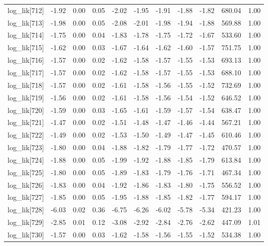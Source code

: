 \begin{table}[ht]
\begin{tabular}{rrrrrrrrrrr}
  log\_lik[712] & -1.92 & 0.00 & 0.05 & -2.02 & -1.95 & -1.91 & -1.88 & -1.82 & 680.04 & 1.00 \\ 
  log\_lik[713] & -1.98 & 0.00 & 0.05 & -2.08 & -2.01 & -1.98 & -1.94 & -1.88 & 569.88 & 1.00 \\ 
  log\_lik[714] & -1.75 & 0.00 & 0.04 & -1.83 & -1.78 & -1.75 & -1.72 & -1.67 & 533.60 & 1.00 \\ 
  log\_lik[715] & -1.62 & 0.00 & 0.03 & -1.67 & -1.64 & -1.62 & -1.60 & -1.57 & 751.75 & 1.00 \\ 
  log\_lik[716] & -1.57 & 0.00 & 0.02 & -1.62 & -1.58 & -1.57 & -1.55 & -1.53 & 693.13 & 1.00 \\ 
  log\_lik[717] & -1.57 & 0.00 & 0.02 & -1.62 & -1.58 & -1.57 & -1.55 & -1.53 & 688.10 & 1.00 \\ 
  log\_lik[718] & -1.57 & 0.00 & 0.02 & -1.61 & -1.58 & -1.56 & -1.55 & -1.52 & 732.69 & 1.00 \\ 
  log\_lik[719] & -1.56 & 0.00 & 0.02 & -1.61 & -1.58 & -1.56 & -1.54 & -1.52 & 646.52 & 1.00 \\ 
  log\_lik[720] & -1.59 & 0.00 & 0.03 & -1.65 & -1.61 & -1.59 & -1.57 & -1.54 & 638.47 & 1.00 \\ 
  log\_lik[721] & -1.47 & 0.00 & 0.02 & -1.51 & -1.48 & -1.47 & -1.46 & -1.44 & 567.21 & 1.00 \\ 
  log\_lik[722] & -1.49 & 0.00 & 0.02 & -1.53 & -1.50 & -1.49 & -1.47 & -1.45 & 610.46 & 1.00 \\ 
  log\_lik[723] & -1.80 & 0.00 & 0.04 & -1.88 & -1.82 & -1.79 & -1.77 & -1.72 & 470.57 & 1.00 \\ 
  log\_lik[724] & -1.88 & 0.00 & 0.05 & -1.99 & -1.92 & -1.88 & -1.85 & -1.79 & 613.84 & 1.00 \\ 
  log\_lik[725] & -1.80 & 0.00 & 0.05 & -1.89 & -1.83 & -1.79 & -1.76 & -1.71 & 467.34 & 1.00 \\ 
  log\_lik[726] & -1.83 & 0.00 & 0.04 & -1.92 & -1.86 & -1.83 & -1.80 & -1.75 & 556.52 & 1.00 \\ 
  log\_lik[727] & -1.85 & 0.00 & 0.05 & -1.95 & -1.88 & -1.85 & -1.82 & -1.77 & 594.17 & 1.00 \\ 
  log\_lik[728] & -6.03 & 0.02 & 0.36 & -6.75 & -6.26 & -6.02 & -5.78 & -5.34 & 421.23 & 1.00 \\ 
  log\_lik[729] & -2.85 & 0.01 & 0.12 & -3.08 & -2.92 & -2.84 & -2.76 & -2.62 & 447.09 & 1.01 \\ 
  log\_lik[730] & -1.57 & 0.00 & 0.03 & -1.62 & -1.58 & -1.56 & -1.55 & -1.52 & 534.38 & 1.00 \\ 

\end{tabular}
\end{table}
